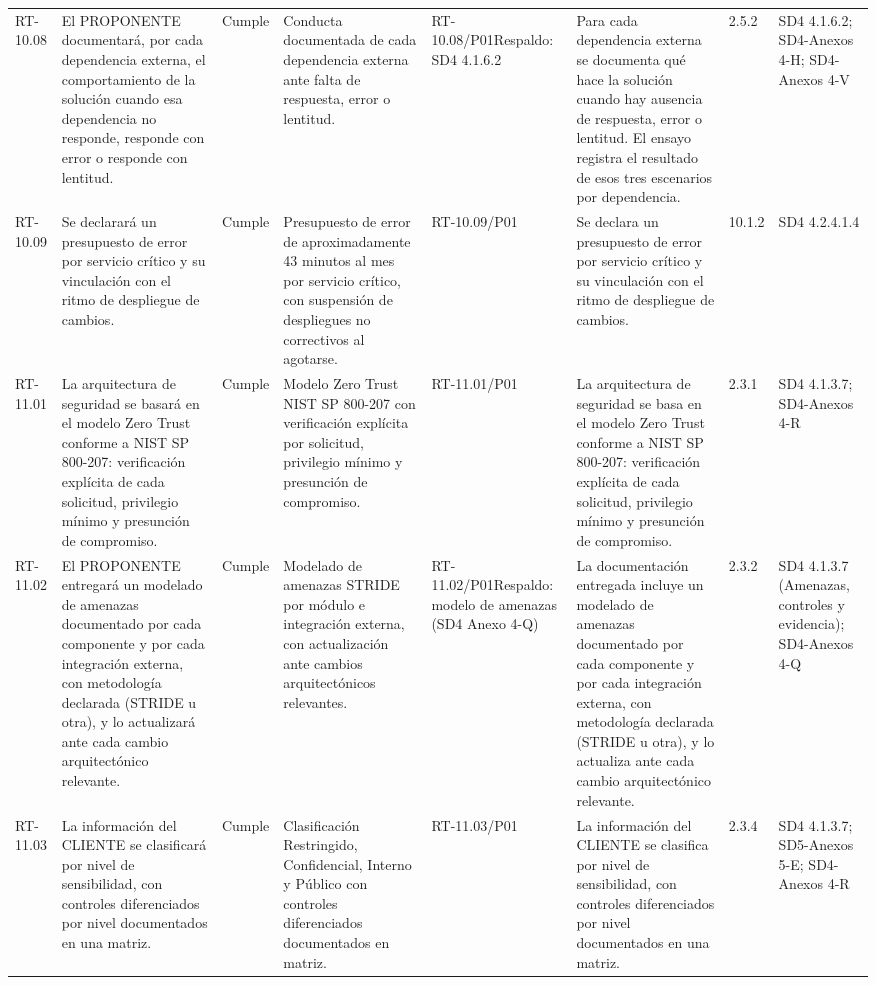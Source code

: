 \documentclass[oficio,firma,final]{lafrox}
\begin{document}
\begin{landscape}
{\begin{longtable}{@{}F{0.054} F{0.173} F{0.061} F{0.191} F{0.106} F{0.180} F{0.067} F{0.168}@{}}
  RT-10.08 & El PROPONENTE documentará, por cada dependencia externa, el comportamiento de la solución cuando esa dependencia no responde, responde con error o responde con lentitud. & Cumple & Conducta documentada de cada dependencia externa ante falta de respuesta, error o lentitud. & RT-10.08/\allowbreak{}P01\newline Respaldo: SD4 4.1.6.2 & Para cada dependencia externa se documenta qué hace la solución cuando hay ausencia de respuesta, error o lentitud. El ensayo registra el resultado de esos tres escenarios por dependencia. & 2.5.2 & SD4 4.1.6.2; SD4-Anexos 4-H; SD4-Anexos 4-V  \\
  RT-10.09 & Se declarará un presupuesto de error por servicio crítico y su vinculación con el ritmo de despliegue de cambios. & Cumple & Presupuesto de error de aproximadamente 43 minutos al mes por servicio crítico, con suspensión de despliegues no correctivos al agotarse. & RT-10.09/\allowbreak{}P01 & Se declara un presupuesto de error por servicio crítico y su vinculación con el ritmo de despliegue de cambios. & 10.1.2 & SD4 4.2.4.1.4  \\
  RT-11.01 & La arquitectura de seguridad se basará en el modelo Zero Trust conforme a NIST SP 800-207: verificación explícita de cada solicitud, privilegio mínimo y presunción de compromiso. & Cumple & Modelo Zero Trust NIST SP 800-207 con verificación explícita por solicitud, privilegio mínimo y presunción de compromiso. & RT-11.01/\allowbreak{}P01 & La arquitectura de seguridad se basa en el modelo Zero Trust conforme a NIST SP 800-207: verificación explícita de cada solicitud, privilegio mínimo y presunción de compromiso. & 2.3.1 & SD4 4.1.3.7; SD4-Anexos 4-R  \\
  RT-11.02 & El PROPONENTE entregará un modelado de amenazas documentado por cada componente y por cada integración externa, con metodología declarada (STRIDE u otra), y lo actualizará ante cada cambio arquitectónico relevante. & Cumple & Modelado de amenazas STRIDE por módulo e integración externa, con actualización ante cambios arquitectónicos relevantes. & RT-11.02/\allowbreak{}P01\newline Respaldo: modelo de amenazas (SD4 Anexo 4-Q) & La documentación entregada incluye un modelado de amenazas documentado por cada componente y por cada integración externa, con metodología declarada (STRIDE u otra), y lo actualiza ante cada cambio arquitectónico relevante. & 2.3.2 & SD4 4.1.3.7 (Amenazas, controles y evidencia); SD4-Anexos 4-Q  \\
  RT-11.03 & La información del CLIENTE se clasificará por nivel de sensibilidad, con controles diferenciados por nivel documentados en una matriz. & Cumple & Clasificación Restringido, Confidencial, Interno y Público con controles diferenciados documentados en matriz. & RT-11.03/\allowbreak{}P01 & La información del CLIENTE se clasifica por nivel de sensibilidad, con controles diferenciados por nivel documentados en una matriz. & 2.3.4 & SD4 4.1.3.7; SD5-Anexos 5-E; SD4-Anexos 4-R  \\

\end{longtable}}
\end{landscape}
\end{document}
